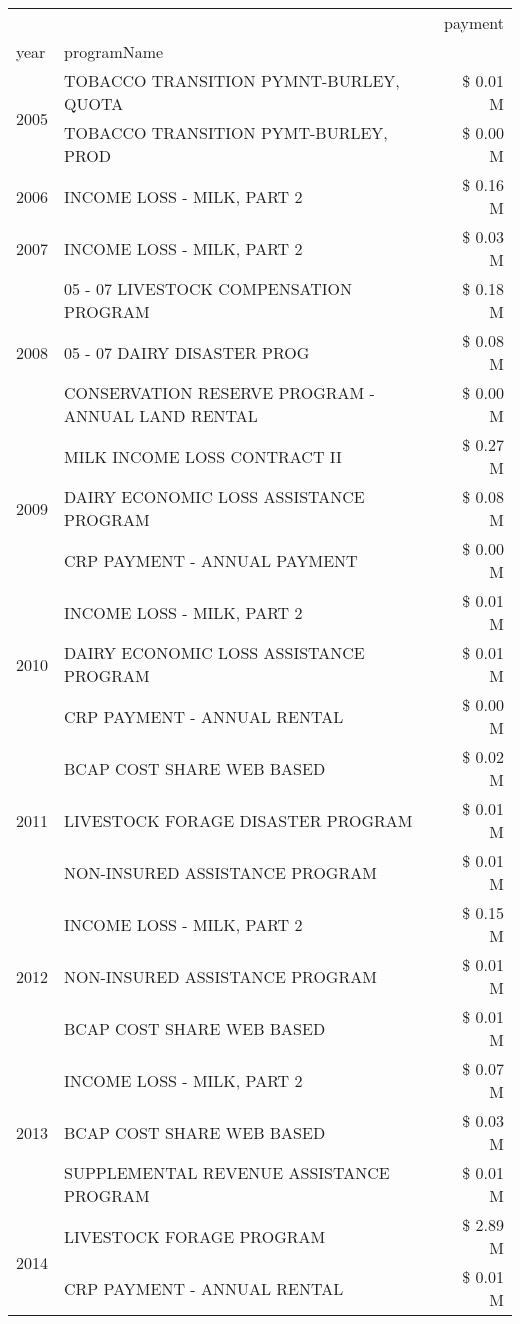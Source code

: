 \begin{tabular}{llr}
\toprule
 &  & payment \\
year & programName &  \\
\midrule
\multirow[t]{2}{*}{2005} & TOBACCO TRANSITION PYMNT-BURLEY, QUOTA & \$ 0.01 M \\
 & TOBACCO TRANSITION PYMT-BURLEY, PROD & \$ 0.00 M \\
\cline{1-3}
2006 & INCOME LOSS - MILK, PART 2 & \$ 0.16 M \\
\cline{1-3}
2007 & INCOME LOSS - MILK, PART 2 & \$ 0.03 M \\
\cline{1-3}
\multirow[t]{3}{*}{2008} & 05 - 07 LIVESTOCK COMPENSATION PROGRAM & \$ 0.18 M \\
 & 05 - 07 DAIRY DISASTER PROG & \$ 0.08 M \\
 & CONSERVATION RESERVE PROGRAM - ANNUAL LAND RENTAL & \$ 0.00 M \\
\cline{1-3}
\multirow[t]{3}{*}{2009} & MILK INCOME LOSS CONTRACT II & \$ 0.27 M \\
 & DAIRY ECONOMIC LOSS ASSISTANCE PROGRAM & \$ 0.08 M \\
 & CRP PAYMENT - ANNUAL PAYMENT & \$ 0.00 M \\
\cline{1-3}
\multirow[t]{3}{*}{2010} & INCOME LOSS - MILK, PART 2 & \$ 0.01 M \\
 & DAIRY ECONOMIC LOSS ASSISTANCE PROGRAM & \$ 0.01 M \\
 & CRP PAYMENT - ANNUAL RENTAL & \$ 0.00 M \\
\cline{1-3}
\multirow[t]{3}{*}{2011} & BCAP COST SHARE WEB BASED & \$ 0.02 M \\
 & LIVESTOCK FORAGE DISASTER PROGRAM & \$ 0.01 M \\
 & NON-INSURED ASSISTANCE PROGRAM & \$ 0.01 M \\
\cline{1-3}
\multirow[t]{3}{*}{2012} & INCOME LOSS - MILK, PART 2 & \$ 0.15 M \\
 & NON-INSURED ASSISTANCE PROGRAM & \$ 0.01 M \\
 & BCAP COST SHARE WEB BASED & \$ 0.01 M \\
\cline{1-3}
\multirow[t]{3}{*}{2013} & INCOME LOSS - MILK, PART 2 & \$ 0.07 M \\
 & BCAP COST SHARE WEB BASED & \$ 0.03 M \\
 & SUPPLEMENTAL REVENUE ASSISTANCE PROGRAM & \$ 0.01 M \\
\cline{1-3}
\multirow[t]{3}{*}{2014} & LIVESTOCK FORAGE PROGRAM & \$ 2.89 M \\
 & CRP PAYMENT - ANNUAL RENTAL & \$ 0.01 M \\

\end{tabular}
